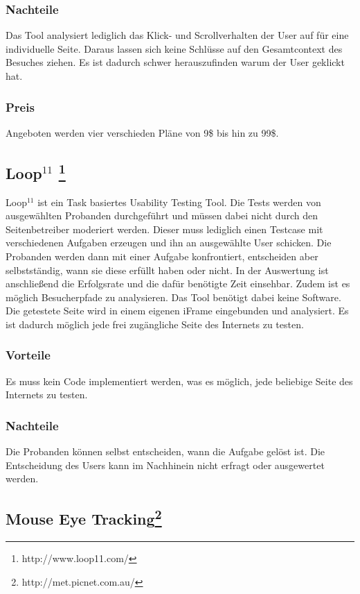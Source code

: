 \subsubsection*{Nachteile}
Das Tool analysiert lediglich das Klick- und Scrollverhalten der User auf für eine individuelle Seite. Daraus lassen sich keine Schlüsse auf den Gesamtcontext des Besuches ziehen. Es ist dadurch schwer herauszufinden warum der User geklickt hat.

\subsubsection*{Preis}
Angeboten werden vier verschieden Pläne von 9\$ bis hin zu 99\$.

\subsection*{Loop$^{11}$ \footnote{http://www.loop11.com/}}

Loop$^{11}$ ist ein Task basiertes Usability Testing Tool. Die Tests werden von ausgewählten Probanden durchgeführt und müssen dabei nicht durch den Seitenbetreiber moderiert werden. Dieser muss lediglich einen Testcase mit verschiedenen Aufgaben erzeugen und ihn an ausgewählte User schicken. Die Probanden werden dann mit einer Aufgabe konfrontiert, entscheiden aber selbstständig, wann sie diese erfüllt haben oder nicht. In der Auswertung ist anschließend die Erfolgsrate und die dafür benötigte Zeit einsehbar. Zudem ist es möglich Besucherpfade zu analysieren. Das Tool benötigt dabei keine Software. Die getestete Seite wird in einem eigenen iFrame eingebunden und analysiert. Es ist dadurch möglich jede frei zugängliche Seite des Internets zu testen.

\subsubsection*{Vorteile}
Es muss kein Code implementiert werden, was es möglich, jede beliebige Seite des Internets zu testen.

\subsubsection*{Nachteile}
Die Probanden können selbst entscheiden, wann die Aufgabe gelöst ist. Die Entscheidung des Users kann im Nachhinein nicht erfragt oder ausgewertet werden.

\subsection*{Mouse Eye Tracking\texttrademark \footnote{http://met.picnet.com.au/}}

